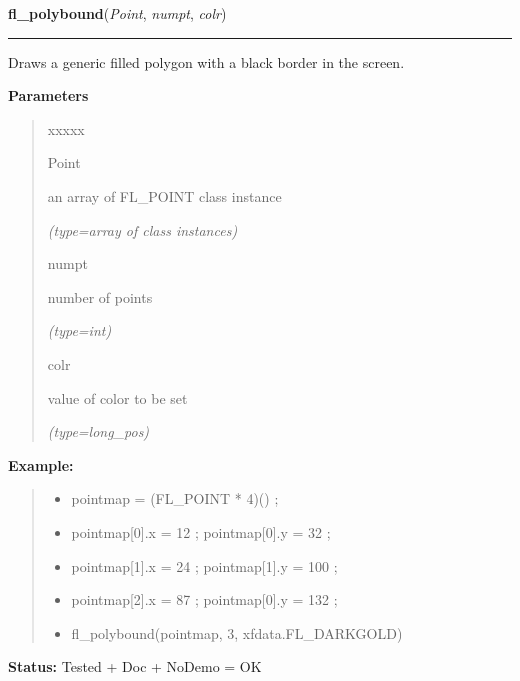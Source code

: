 \hspace{.8\funcindent}\begin{boxedminipage}{\funcwidth}

    \raggedright \textbf{fl\_polybound}(\textit{Point}, \textit{numpt}, \textit{colr})

    \vspace{-1.5ex}

    \rule{\textwidth}{0.5\fboxrule}
\setlength{\parskip}{2ex}
    Draws a generic filled polygon with a black border in the screen.

\setlength{\parskip}{1ex}
      \textbf{Parameters}
      \vspace{-1ex}

      \begin{quote}
        \begin{Ventry}{xxxxx}

          \item[Point]

          an array of FL\_POINT class instance

            {\it (type=array of class instances)}

          \item[numpt]

          number of points

            {\it (type=int)}

          \item[colr]

          value of color to be set

            {\it (type=long\_pos)}

        \end{Ventry}

      \end{quote}

\textbf{Example:}
\begin{quote}
  \begin{itemize}

  \item
    \setlength{\parskip}{0.6ex}
pointmap = (FL\_POINT * 4)() ;



  \item pointmap[0].x = 12 ; pointmap[0].y = 32 ;



  \item pointmap[1].x = 24 ; pointmap[1].y = 100 ;



  \item pointmap[2].x = 87 ; pointmap[0].y = 132 ;



  \item fl\_polybound(pointmap, 3, xfdata.FL\_DARKGOLD)



\end{itemize}

\end{quote}

\textbf{Status:} Tested + Doc + NoDemo = OK



    \end{boxedminipage}

